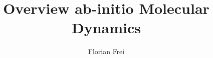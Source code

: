 \documentclass[12pt]{scrartcl}
\begin{document}
\author{Florian Frei}
\title{Overview ab-initio Molecular Dynamics}

\maketitle

\newpage

\tableofcontents

\newpage




\end{document}
